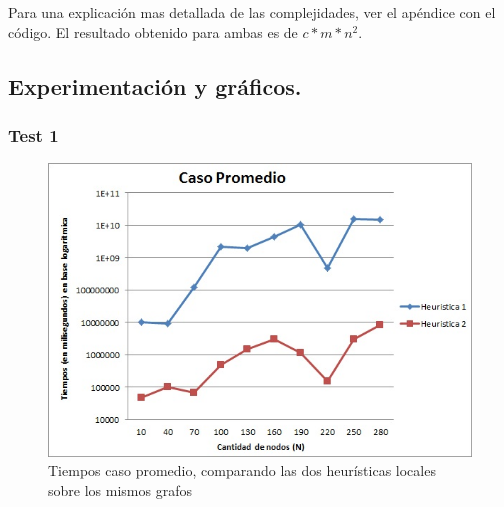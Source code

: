 Para una explicación mas detallada de las complejidades, ver el apéndice con el código. El resultado obtenido para ambas es de $ c*m*n^2 $.


\subsection{Experimentación y gráficos.}

\vspace*{0.3cm}

\subsubsection{Test 1}

\vspace*{0.3cm}

\begin{figure}[H]
  \begin{center}
      \includegraphics[scale=0.75]{../Ejercicio4Promedio.jpg}
  \end{center}
  \caption{Tiempos caso promedio, comparando las dos heurísticas locales sobre los mismos grafos}
\end{figure}

